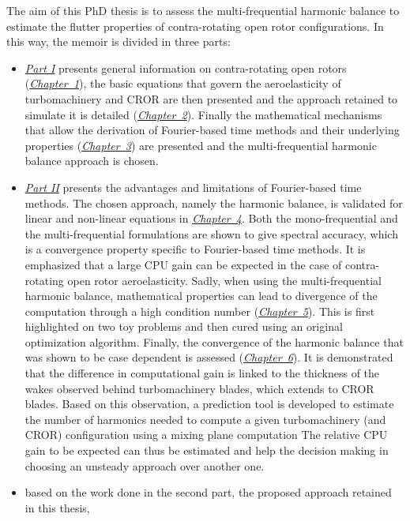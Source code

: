 The aim of this PhD thesis is to assess the
multi-frequential harmonic balance
to estimate the flutter properties of contra-rotating open rotor
configurations. In this way, the memoir is divided in three parts:
\begin{itemize}
	\item \hyperref[part1]{\emph{Part I}} presents general information on 
	contra-rotating open rotors (\hyperref[cha:cror]{\emph{Chapter~1}}),
	the basic equations that govern the aeroelasticity of
	turbomachinery and CROR are then presented and the approach retained 
	to simulate it is detailed (\hyperref[cha:ael]{\emph{Chapter~2}}).
	Finally the mathematical mechanisms that allow the derivation
	of Fourier-based time methods and their underlying properties
	(\hyperref[cha:spectral_methods]{\emph{Chapter~3}}) are presented and the 
	multi-frequential harmonic balance approach is chosen.
	\item \hyperref[part2]{\emph{Part II}} 
	presents the advantages and limitations
	of Fourier-based time methods. The chosen approach, namely
	the harmonic balance, is validated for linear and non-linear
	equations in \hyperref[cha:validation_hb]{\emph{Chapter~4}}. Both the
	mono-frequential and the multi-frequential formulations
	are shown to give spectral accuracy, which is a convergence
	property specific to Fourier-based time methods.
	It is emphasized
	that a large CPU gain can be expected in the
	case of contra-rotating open rotor aeroelasticity. 
	Sadly, when using the multi-frequential harmonic
	balance, mathematical properties can lead to divergence
	of the computation through a high condition number
	(\hyperref[cha:limitations_condition_number]{\emph{Chapter~5}}). This is 
	first highlighted on two toy problems and then cured using
	an original optimization algorithm.
	Finally, the convergence of the harmonic balance 
	that was shown to be case dependent is
	assessed (\hyperref[cha:limitations_convergence]{\emph{Chapter~6}}). 
	It is demonstrated that the difference in computational
	gain is linked to the thickness of the wakes observed behind
	turbomachinery blades, which extends to CROR blades. Based on this observation,
	a prediction tool is developed to estimate the
	number of harmonics needed to compute a given turbomachinery (and CROR)
	configuration using a mixing plane computation 
	The relative CPU gain to be expected can thus be estimated
	and help the decision making in choosing an unsteady approach
	over another one.
	\item based on the work done in the second part,
	the proposed approach retained in this thesis, 

\end{itemize}
